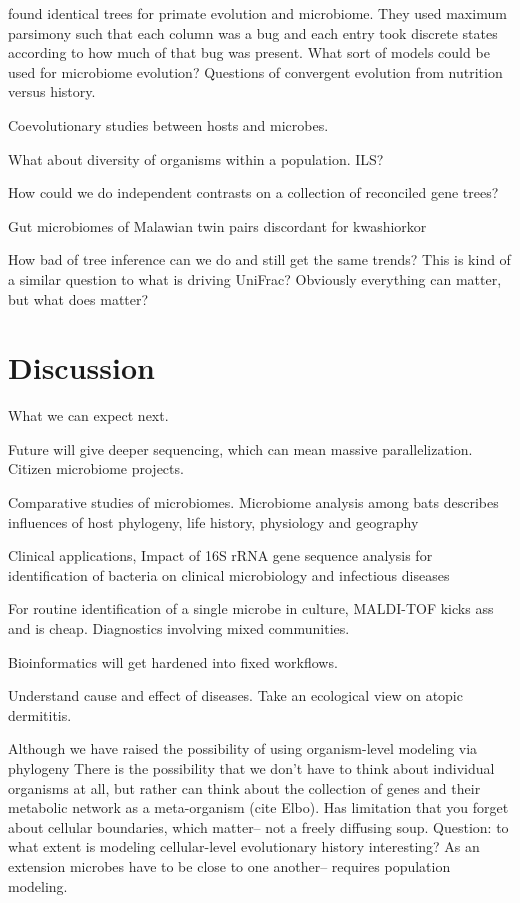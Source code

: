 \documentclass{amsart}
\begin{document}
\citet{ochman2010evolutionary} found identical trees for primate evolution and microbiome.
They used maximum parsimony such that each column was a bug and each entry took discrete states according to how much of that bug was present.
What sort of models could be used for microbiome evolution?
Questions of convergent evolution from nutrition versus history.

Coevolutionary studies between hosts and microbes.

What about diversity of organisms within a population.
ILS?

How could we do independent contrasts on a collection of reconciled gene trees?

Gut microbiomes of Malawian twin pairs discordant for kwashiorkor \cite{smith2013gut}

How bad of tree inference can we do and still get the same trends?
This is kind of a similar question to what is driving UniFrac?
Obviously everything can matter, but what does matter?

\section{Discussion}
What we can expect next.

Future will give deeper sequencing, which can mean massive parallelization.
Citizen microbiome projects.


Comparative studies of microbiomes.
\citep{phillips2012microbiome}
Microbiome analysis among bats describes influences of host phylogeny, life history, physiology and geography

Clinical applications,
\citep{clarridge2004}
{{I}mpact of 16{S} r{RNA} gene sequence analysis for identification of bacteria on clinical microbiology and infectious diseases}

For routine identification of a single microbe in culture, MALDI-TOF kicks ass and is cheap.
Diagnostics involving mixed communities.

Bioinformatics will get hardened into fixed workflows.

Understand cause and effect of diseases.
Take an ecological view on atopic dermititis.

Although we have raised the possibility of using organism-level modeling via phylogeny
There is the possibility that we don't have to think about individual organisms at all, but rather can think about the collection of genes and their metabolic network as a meta-organism (cite Elbo).
Has limitation that you forget about cellular boundaries, which matter-- not a freely diffusing soup.
Question: to what extent is modeling cellular-level evolutionary history interesting?
As an extension microbes have to be close to one another-- requires population modeling.
\end{document}
